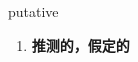 
\begin{frame}
{\huge putative}
\begin{center}
\begin{enumerate}\Large
  \item \textbf{推测的，假定的}
\end{enumerate}
\end{center}
\end{frame}
